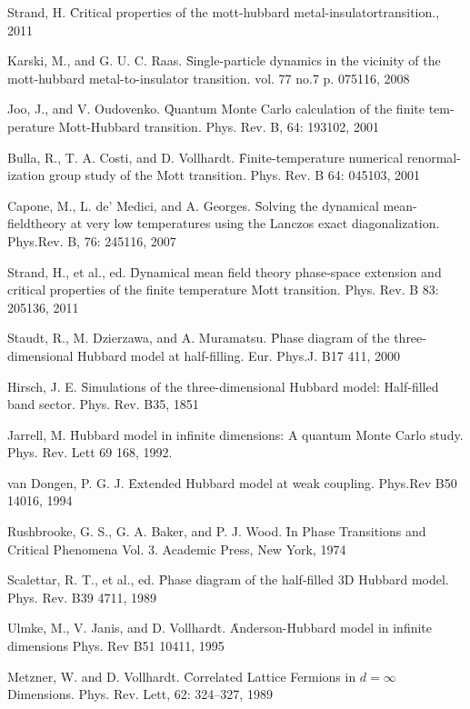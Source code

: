 \begin{thebibliography}{4}
{Strand, H. \f{Critical properties of the mott-hubbard metal-insulatortransition.}, 2011}

{Karski, M., and G. U. C. Raas. \f{Single-particle dynamics in the vicinity of the mott-hubbard metal-to-insulator transition.} vol. 77 no.7 p. 075116, 2008}

{Joo, J., and V. Oudovenko. \f{Quantum Monte Carlo calculation of the finite tem-perature Mott-Hubbard transition.} Phys. Rev. B,  64: 193102, 2001 }

{Bulla, R., T. A. Costi, and D. Vollhardt. \f{Finite-temperature numerical renormal-ization group study of the Mott transition.} Phys. Rev. B 64: 045103, 2001}

{Capone, M., L. de’ Medici, and A. Georges.  \f{Solving the dynamical mean-fieldtheory at very low temperatures using the Lanczos exact diagonalization.} Phys.Rev. B, 76: 245116, 2007}

{Strand, H., et al., ed.  \f{Dynamical mean field theory phase-space extension and critical properties of the finite temperature Mott transition.} Phys. Rev. B 83: 205136, 2011}

{Staudt, R., M. Dzierzawa, and A. Muramatsu. \f{Phase diagram of the three-dimensional Hubbard model at half-filling.} Eur. Phys.J. B17 411, 2000}

{Hirsch, J. E. \f{Simulations of the three-dimensional Hubbard model: Half-filled band sector.} Phys. Rev. B35, 1851}

{Jarrell, M. \f{Hubbard model in infinite dimensions: A quantum Monte Carlo study.} Phys. Rev. Lett 69 168, 1992. }

{van Dongen, P. G. J. \f{Extended Hubbard model at weak coupling.} Phys.Rev B50 14016, 1994}

{Rushbrooke, G. S., G. A. Baker, and P. J. Wood. \f{In Phase Transitions and Critical Phenomena Vol. 3.} Academic Press, New York, 1974}

{Scalettar, R. T., et al., ed. \f{Phase diagram of the half-filled 3D Hubbard model.} Phys. Rev. B39 4711, 1989}

{Ulmke, M., V. Janis, and D. Vollhardt. \f{Anderson-Hubbard model in infinite dimensions} Phys. Rev B51 10411, 1995}

{Metzner, W. and D. Vollhardt. \f{Correlated Lattice Fermions in $d = \infty$ Dimensions.} Phys. Rev. Lett, 62: 324–327, 1989}


\end{thebibliography}
